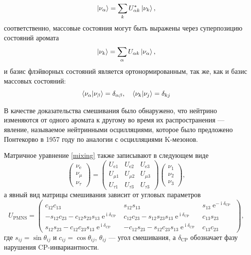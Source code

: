 \documentclass[12pt]{article}
\DeclareMathOperator{\Exp}{e}
\DeclareMathOperator\Iunit{i}
\renewcommand\exp\Exp
\renewcommand\imath\Iunit
\begin{document}
\begin{equation}\label{mixing}
  \ket{\nu_{\alpha}} = \sum_{k} U^*_{\alpha k} \ket{\nu_{k}}, 
\end{equation}
соответственно, массовые состояния могут быть выражены через суперпозицию
состояний аромата
\begin{equation}
  \ket{\nu_{k}} = \sum_{\alpha} U_{\alpha k} \ket{\nu_{\alpha}},
\end{equation}
и базис флэйворных состояний является ортонормированным, так же, как и базис
массовых состояний:
\begin{equation}
  \braket{\nu_{\alpha}|\nu_{\beta}} = \delta_{\alpha\beta},
  \quad
  \braket{\nu_{k}|\nu_{j}}=\delta_{kj}
\end{equation}
	
В качестве доказательства смешивания было обнаружено, что нейтрино изменяются от
одного аромата к другому во время их распространения — явление, называемое
нейтринными осцилляциями, которое было предложено Понтекорво в 1957 году по
аналогии с осцилляциями K-мезонов.

Матричное уравнение \eqref{mixing} также записывают в следующем виде
\begin{equation}
  \begin{pmatrix}
	\nu_{\text{e}}\\
	\nu_{\mu}\\
	\nu_{\tau}
  \end{pmatrix}
  =
  \begin{pmatrix}
	U_{\text{e}1}& U_{\text{e}2}& U_{\text{e}3}\\
	U_{\mu1}& U_{\mu2}& U_{\mu3}\\
	U_{\tau1}& U_{\tau3}& U_{\tau3}
  \end{pmatrix}
  \begin{pmatrix}
	\nu_{1}\\
	\nu_{2}\\
	\nu_{3}
  \end{pmatrix},
\end{equation}
а явный вид матрицы смешивания зависит от угловых параметров
\begin{equation}
  U_{\text{PMNS}}=
  \begin{pmatrix}
    c_{12}c_{13}& s_{12}s_{13}& s_{13}\exp^{-\imath\delta_{\text{CP}}}\\
    -s_{12}c_{23} - c_{12}s_{23}s_{13}\exp^{\imath\delta_{\text{CP}}}&
    c_{12}c_{23} - s_{12}s_{23}s_{13}\exp^{\imath\delta_{\text{CP}}}& c_{13}s_{23}\\
    s_{12}s_{23}-c_{12}c_{23}s_{13}\exp^{\imath\delta_{\text{CP}}}&
    -c_{12}s_{23}-s_{12}c_{23}s_{13}\exp^{\imath\delta_{\text{CP}}}& c_{13}c_{23}
  \end{pmatrix},
\end{equation}
где $s_{ij}=\sin{\theta_{ij}}$ и $c_{ij}=\cos{\theta_{ij}}$, $\theta_{ij}$ —
угол смешивания, а $\delta_{\text{CP}}$ обозначает фазу нарушения
\(\text{CP}\)-инвариантности.
\end{document}
